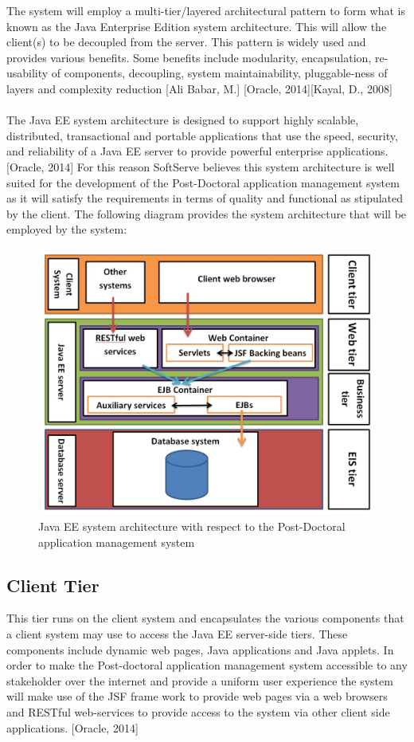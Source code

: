 \documentclass[12pt]{article}
\begin{document}
The system will employ a multi-tier/layered architectural pattern to form what is known as the Java Enterprise Edition system architecture. This will allow the client(s) to be decoupled from the server. This pattern is widely used and provides various benefits. Some benefits include modularity, encapsulation, re-usability of components, decoupling, system maintainability, pluggable-ness of layers and complexity reduction [Ali Babar, M.] [Oracle, 2014][Kayal, D., 2008]\\
\\
The Java EE system architecture is designed to support highly scalable, distributed, transactional and portable applications that use the speed, security, and reliability of a Java EE server to provide powerful enterprise applications. [Oracle, 2014] For this reason SoftServe believes this system architecture is well suited for the development of the Post-Doctoral application management system as it will satisfy the requirements in terms of quality and functional as stipulated by the client. The following diagram provides the system architecture that will be employed by the system:\\

\begin{figure}[H]
\centering
\includegraphics[scale=0.6]{../Images_Docs/Diagrams/Architecture/Java EE system architecture.jpg}
\caption{Java EE system architecture with respect to the Post-Doctoral application management system}
\end{figure}

\subsection{Client Tier}
This tier runs on the client system and encapsulates the various components that a client system may use to access the Java EE server-side tiers. These components include dynamic web pages, Java applications and Java applets. In order to make the Post-doctoral application management system accessible to any stakeholder over the internet and provide a uniform user experience the system will make use of the JSF frame work to provide web pages via a web browsers and RESTful web-services to provide access to the system via other client side applications. [Oracle, 2014]  
\end{document}
